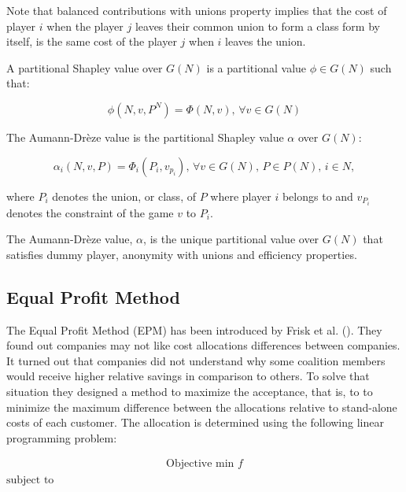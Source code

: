 Note that balanced contributions with unions property implies that the cost of player $i$ when the player $j$ leaves their common union to form a class form by itself, is the same cost of the player $j$ when $i$ leaves the union. 
\begin{definition}\label{AD=Sahpley}
	
	A partitional Shapley value over $G(N)$ is a partitional value $\phi \in G(N)$ such that:
	
	$$\phi(N,v,P^N) = \Phi(N,v) \text{, } \forall v \in G(N)$$
\end{definition}


\begin{definition}
	
	The Aumann-Dr\`eze value is the partitional Shapley value $\alpha$ over $G(N)$:
	
	$$\alpha_i (N,v,P) = \Phi_{i}(P_i, v_{p_{i}}) \text{, } \forall v \in G(N) \text{, } P \in P(N) \text{, } i \in N,$$
	
	where $P_{i}$ denotes the union, or class, of $P$ where player $i$ belongs to and $v_{P_{i}}$ denotes the constraint of the game $v$ to $P_i$.
\end{definition}

\begin{theorem}
	The Aumann-Dr\`eze value, $\alpha$, is the unique partitional value over $G(N)$ that satisfies dummy player, anonymity with unions and efficiency properties.
\end{theorem}

\subsection{Equal Profit Method}

The Equal Profit Method (EPM) has been introduced by Frisk et al. (\cite{Frisk}). They found out companies may not like cost allocations differences between companies. It turned out that companies did not understand why some coalition members would receive higher relative savings in comparison to others. To solve that situation they designed a method to maximize the acceptance, that is, to to minimize the maximum difference between the allocations relative to stand-alone costs of each customer. The allocation is determined using the following linear programming problem:

\begin{equation}\label{eq1}
\begin{split}
\textrm{Objective min } f
\end{split}
\end{equation}
$\textrm{subject to}$

